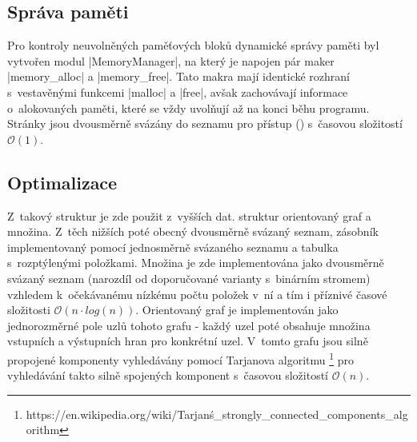 \subsection{Správa paměti}
Pro kontroly neuvolněných paměťových bloků dynamické správy paměti byl vytvořen modul \ic|MemoryManager|, na který je napojen pár maker \ic|memory_alloc| a \ic|memory_free|. Tato makra mají identické rozhraní s~vestavěnými funkcemi \ic|malloc| a \ic|free|, avšak zachovávají informace o~alokovaných  paměti, které se vždy uvolňují až na konci běhu programu. Stránky jsou dvousměrně svázány do seznamu pro přístup () s~časovou složitostí $\mathcal{O}(1)$.

\subsection{Optimalizace}
Z~takový struktur je zde použit z~vyšších dat. struktur orientovaný graf a množina. Z~těch nižších poté obecný dvousměrně svázaný seznam, zásobník implementovaný pomocí jednosměrně svázaného seznamu a tabulka s~rozptýlenými položkami. Množina je zde implementována jako dvousměrně svázaný seznam (narozdíl od doporučované varianty s~binárním stromem) vzhledem k~očekávanému nízkému počtu položek v~ní a tím i příznivé časové složitosti $\mathcal{O}(n\cdot log(n))$. Orientovaný graf je implementován jako jednorozměrné pole uzlů tohoto grafu - každý uzel poté obsahuje množina vstupních a výstupních hran pro konkrétní uzel. V~tomto grafu jsou silně propojené komponenty vyhledávány pomocí Tarjanova algoritmu \footnote{https://en.wikipedia.org/wiki/Tarjan\'s\_strongly\_connected\_components\_algorithm} pro vyhledávání takto silně spojených komponent s~časovou složitostí $\mathcal{O}(n)$.